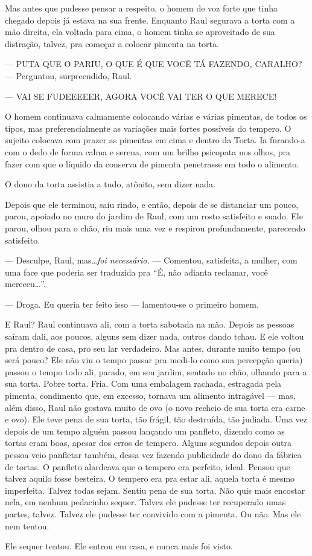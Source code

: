 Mas antes que pudesse pensar a respeito, o homem de voz forte que tinha chegado depois já estava na sua frente. Enquanto Raul segurava a torta com a mão direita, ela voltada para cima, o homem tinha se aproveitado de sua distração, talvez, pra começar a colocar pimenta na torta.

--- PUTA QUE O PARIU, O QUE É QUE VOCÊ TÁ FAZENDO, CARALHO? --- Perguntou, surpreendido, Raul.

--- VAI SE FUDEEEEER, AGORA VOCÊ VAI TER O QUE MERECE!

O homem continuava calmamente colocando várias e várias pimentas, de todos os tipos, mas preferencialmente as variações mais fortes possíveis do tempero. O sujeito colocava com prazer as pimentas em cima e dentro da Torta. Ia furando-a com o dedo de forma calma e serena, com um brilho psicopata nos olhos, pra fazer com que o líquido da conserva de pimenta penetrasse em todo o alimento.

O dono da torta assistia a tudo, atônito, sem dizer nada.

Depois que ele terminou, saiu rindo, e então, depois de se distanciar um pouco, parou, apoiado no muro do jardim de Raul, com um rosto satisfeito e suado. Ele parou, olhou para o chão, riu mais uma vez e respirou profundamente, parecendo satisfeito.

--- Desculpe, Raul, mas\ldots \emph{foi necessário.} --- Comentou, satisfeita, a mulher, com uma face que poderia ser traduzida pra ``É, não adianta reclamar, você mereceu\ldots''.

--- Droga. Eu queria ter feito isso --- lamentou-se o primeiro homem.

E Raul? Raul continuava ali, com a torta sabotada na mão. Depois as pessoas saíram dali, aos poucos, alguns sem dizer nada, outros dando tchau. E ele voltou pra dentro de casa, pro seu lar verdadeiro. Mas antes, durante muito tempo (ou será pouco? Ele não viu o tempo passar pra medi-lo como sua percepção queria) passou o tempo todo ali, parado, em seu jardim, sentado no chão, olhando para a sua torta. Pobre torta. Fria. Com uma embalagem rachada, estragada pela pimenta, condimento que, em excesso, tornava um alimento intragável --- mas, além disso, Raul não gostava muito de ovo (o novo recheio de sua torta era carne e ovo). Ele teve pena de sua torta, tão frágil, tão destruída, tão judiada. Uma vez depois de um tempo alguém passou lançando um panfleto, dizendo como as tortas eram boas, apesar dos erros de tempero. Alguns segundos depois outra pessoa veio panfletar também, dessa vez fazendo publicidade do dono da fábrica de tortas. O panfleto alardeava que o tempero era perfeito, ideal. Pensou que talvez aquilo fosse besteira. O tempero era pra estar ali, aquela torta é mesmo imperfeita. Talvez todas sejam. Sentiu pena de sua torta. Não quis mais encostar nela, em nenhum pedacinho sequer. Talvez ele pudesse ter recuperado umas partes, talvez. Talvez ele pudesse ter convivido com a pimenta. Ou não. Mas ele nem tentou.

Ele sequer tentou. Ele entrou em casa, e nunca mais foi visto.
